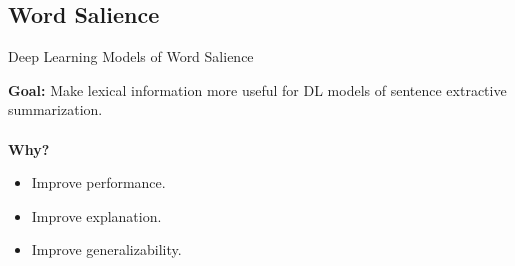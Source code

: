 \subsection{Word Salience}

\begin{frame}{Deep Learning Models of Word Salience}


 
\textbf{Goal:} Make lexical information more useful for DL models of 
sentence extractive summarization.\\
~\\
\textbf{Why?} 
\begin{itemize}
 \item Improve performance.
 \item Improve explanation. 
 \item Improve generalizability.
 \end{itemize}
 \end{frame}

